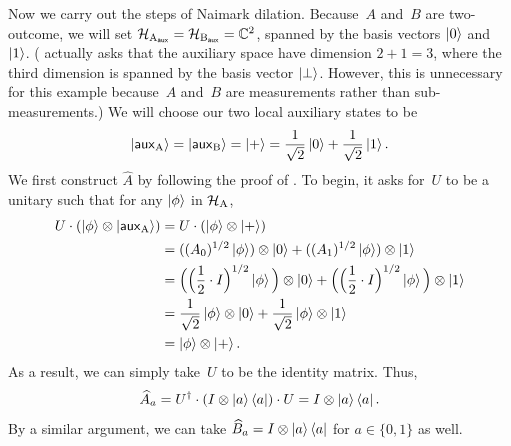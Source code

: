 \begin{example}
Now we carry out the steps of Naimark dilation.
Because~$A$ and~$B$ are two-outcome,
we will set $\mathcal{H}_{\mathrm{A}_{\mathsf{aux}}} = \mathcal{H}_{\mathrm{B}_{\mathsf{aux}}} = \mathbb C^2$,
spanned by the basis vectors $\ket{0}$ and $\ket{1}$.
( actually asks that the auxiliary space have dimension $2+1 = 3$,
where the third dimension is spanned by the basis vector $\ket{\bot}$.
However, this is unnecessary for this example because~$A$ and~$B$
are measurements rather than sub-measurements.)
We will choose our two local auxiliary states
to be
\begin{equation*}
\ket{\mathsf{aux}_{\mathrm{A}}} = \ket{\mathsf{aux}_{\mathrm{B}}}
	= \ket{+} = \frac{1}{\sqrt{2}}\ket{0} + \frac{1}{\sqrt{2}}\ket{1}.
\end{equation*}
We first construct $\widehat{A}$ by following the proof of .
To begin, it asks for~$U$ to be a unitary such that for any $\ket{\phi}$ in $\mathcal{H}_{\mathrm{A}}$,
\begin{align*}
U \cdot (\ket{\phi} \otimes \ket{\mathsf{aux}_{\mathrm{A}}})
&=U \cdot (\ket{\phi} \otimes \ket{+})\\
&=  ((A_{0})^{1/2} \ket{\phi}) \otimes \ket{0} + ((A_{1})^{1/2} \ket{\phi}) \otimes \ket{1}\\
&= \Big(\Big(\frac{1}{2}\cdot I\Big)^{1/2} \ket{\phi}\Big) \otimes \ket{0}
	+ \Big(\Big(\frac{1}{2}\cdot I\Big)^{1/2} \ket{\phi}\Big) \otimes \ket{1}\\
&=\frac{1}{\sqrt{2}} \ket{\phi} \otimes \ket{0} + \frac{1}{\sqrt{2}} \ket{\phi} \otimes \ket{1}\\
&= \ket{\phi} \otimes \ket{+}.
\end{align*}
As a result, we can simply take~$U$ to be the identity matrix.
Thus,
\begin{equation*}
\widehat{A}_a = U^{\dagger} \cdot (I \otimes \ket{a} \bra{a}) \cdot U = I \otimes \ket{a}\bra{a}.
\end{equation*}
By a similar argument, we can take $\widehat{B}_a = I \otimes \ket{a}\bra{a}$ for $a \in \{0, 1\}$ as well.


\end{example}

